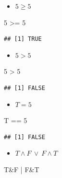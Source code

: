 \documentclass[12pt,a4paper]{article}
\newenvironment{Shaded}{\begin{snugshade}}{\end{snugshade}}
\newcommand{\DecValTok}[1]{\textcolor[rgb]{0.00,0.00,0.81}{#1}}
\newcommand{\NormalTok}[1]{#1}
\newcommand{\SpecialCharTok}[1]{\textcolor[rgb]{0.00,0.00,0.00}{#1}}
\begin{document}
\begin{itemize}
  \item $5 \geq 5$
\end{itemize}

\begin{Shaded}
\begin{Highlighting}[]
    \DecValTok{5} \SpecialCharTok{\textgreater{}=} \DecValTok{5}
\end{Highlighting}
\end{Shaded}

\begin{verbatim}
## [1] TRUE
\end{verbatim}

\begin{itemize}
  \item $5 > 5$
\end{itemize}

\begin{Shaded}
\begin{Highlighting}[]
    \DecValTok{5} \SpecialCharTok{\textgreater{}} \DecValTok{5}
\end{Highlighting}
\end{Shaded}

\begin{verbatim}
## [1] FALSE
\end{verbatim}

\begin{itemize}
  \item $T = 5$
\end{itemize}

\begin{Shaded}
\begin{Highlighting}[]
\NormalTok{    T }\SpecialCharTok{==} \DecValTok{5}
\end{Highlighting}
\end{Shaded}

\begin{verbatim}
## [1] FALSE
\end{verbatim}

\begin{itemize}
  \item $T \land F \ \lor \ F \land T$
\end{itemize}

\begin{Shaded}
\begin{Highlighting}[]
\NormalTok{    T}\SpecialCharTok{\&}\NormalTok{F }\SpecialCharTok{|}\NormalTok{ F}\SpecialCharTok{\&}\NormalTok{T}
\end{Highlighting}
\end{Shaded}
\end{document}
